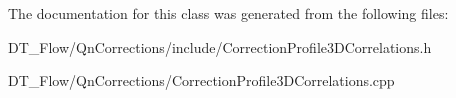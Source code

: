 The documentation for this class was generated from the following files\+:\begin{DoxyCompactItemize}
\item 
D\+T\+\_\+\+Flow/\+Qn\+Corrections/include/Correction\+Profile3\+D\+Correlations.\+h\item 
D\+T\+\_\+\+Flow/\+Qn\+Corrections/Correction\+Profile3\+D\+Correlations.\+cpp\end{DoxyCompactItemize}
